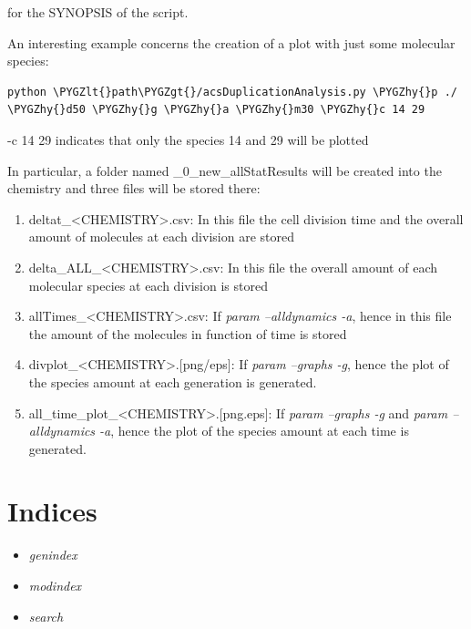 \documentclass[letterpaper,10pt,english]{sphinxmanual}
\def\PYGZlt{\char`\<}
\def\PYGZgt{\char`\>}
\def\PYGZhy{\char`\-}
\begin{document}
for the SYNOPSIS of the script.

An interesting example concerns the creation of a plot with just some molecular species:

\begin{Verbatim}[commandchars=\\\{\}]
python \PYGZlt{}path\PYGZgt{}/acsDuplicationAnalysis.py \PYGZhy{}p ./ \PYGZhy{}d50 \PYGZhy{}g \PYGZhy{}a \PYGZhy{}m30 \PYGZhy{}c 14 29
\end{Verbatim}

-c 14 29 indicates that only the species 14 and 29 will be  plotted

In particular, a folder named \_0\_new\_allStatResults will be created into the chemistry and three files will be stored there:
\begin{enumerate}
\item {} 
deltat\_\textless{}CHEMISTRY\textgreater{}.csv: In this file the cell division time and the overall amount of molecules at each division are stored

\item {} 
delta\_ALL\_\textless{}CHEMISTRY\textgreater{}.csv: In this file the overall amount of each molecular species at each division is stored

\item {} 
allTimes\_\textless{}CHEMISTRY\textgreater{}.csv: If \emph{param --alldynamics -a}, hence in this file the amount of the molecules in function of time is stored

\item {} 
divplot\_\textless{}CHEMISTRY\textgreater{}.{[}png/eps{]}: If \emph{param --graphs -g}, hence the plot of the species amount at each generation is generated.

\item {} 
all\_time\_plot\_\textless{}CHEMISTRY\textgreater{}.{[}png.eps{]}: If \emph{param --graphs -g} and \emph{param --alldynamics -a}, hence the plot of the species amount at each time is generated.

\end{enumerate}


\chapter{Indices}
\label{index:indices}\begin{itemize}
\item {} 
\emph{genindex}

\item {} 
\emph{modindex}

\item {} 
\emph{search}

\end{itemize}
\end{document}
